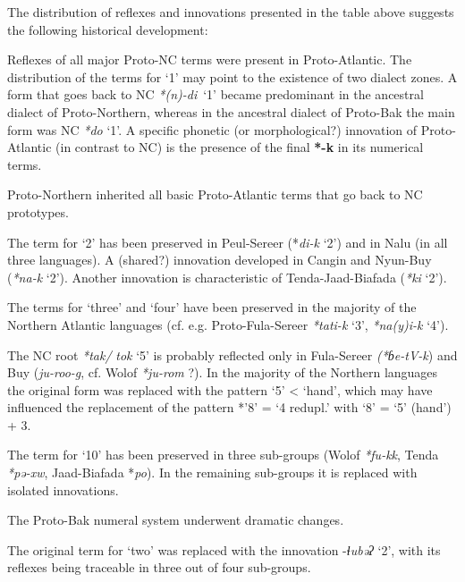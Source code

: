The distribution of reflexes and innovations presented in the table above suggests the following historical development:

Reflexes of all major Proto-NC terms were present in Proto-Atlantic. The distribution of the terms for ‘1’ may point to the existence of two dialect zones. A form that goes back to NC \textit{*(n}\textit{)-di}~‘1’ became predominant in the ancestral dialect of Proto-Northern, whereas in the ancestral dialect of Proto-Bak the main form was NC \textit{*do} ‘1’. A specific phonetic (or morphological?) innovation of Proto-Atlantic (in contrast to NC) is the presence of the final \textbf{*-k} in its numerical terms.

Proto-Northern inherited all basic Proto-Atlantic terms that go back to NC prototypes. 

The term for ‘2’ has been preserved in Peul-Sereer (*\textit{di-k} ‘2’) and in Nalu (in all three languages). A (shared?) innovation developed in Cangin and Nyun-Buy (\textit{*na}\textit{-}\textit{k} ‘2’). Another innovation is characteristic of Tenda-Jaad-Biafada (\textit{*ki} ‘2’). 

The terms for ‘three’ and ‘four’ have been preserved in the majority of the Northern Atlantic languages (cf. e.g. Proto-Fula-Sereer \textit{*tati}\textit{-}\textit{k} ‘3’, \textit{*na}\textit{(y}\textit{)i}\textit{-}\textit{k} ‘4’). 

The NC root \textit{*tak/} \textit{tok} ‘5’ is probably reflected only in Fula-Sereer \textit{(*ɓe-tV-k}) and Buy (\textit{ju-roo-g}, cf. Wolof \textit{*ju-rom} ?). In the majority of the Northern languages the original form was replaced with the pattern ‘5’ < ‘hand’, which may have influenced the replacement of the pattern *’8’ = ‘4 redupl.’ with ‘8’ = ‘5’ (hand’) + 3.

The term for ‘10’ has been preserved in three sub-groups (Wolof \textit{*fu-kk}, Tenda \textit{*pə-xw}, Jaad-Biafada *\textit{po}). In the remaining sub-groups it is replaced with isolated innovations.

The Proto-Bak numeral system underwent dramatic changes.

The original term for ‘two’ was replaced with the innovation -\textit{ɬubəʔ} ‘2’, with its reflexes being traceable in three out of four sub-groups.

